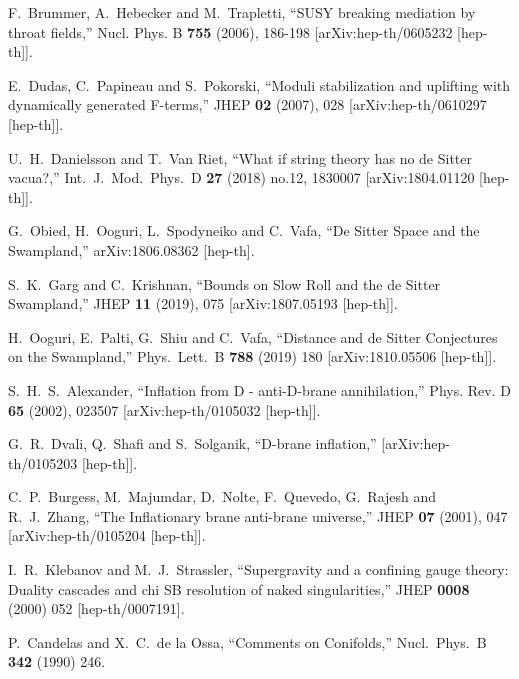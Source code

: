 \documentclass[12pt]{article}
\numberwithin{equation}{section}
\begin{document}
\begin{thebibliography}{999}
F.~Brummer, A.~Hebecker and M.~Trapletti,
``SUSY breaking mediation by throat fields,''
Nucl. Phys. B \textbf{755} (2006), 186-198
[arXiv:hep-th/0605232 [hep-th]].

E.~Dudas, C.~Papineau and S.~Pokorski,
``Moduli stabilization and uplifting with dynamically generated F-terms,''
JHEP \textbf{02} (2007), 028
[arXiv:hep-th/0610297 [hep-th]].

  U.~H.~Danielsson and T.~Van Riet,
  ``What if string theory has no de Sitter vacua?,''
  Int.\ J.\ Mod.\ Phys.\ D {\bf 27} (2018) no.12,  1830007
  [arXiv:1804.01120 [hep-th]].

  G.~Obied, H.~Ooguri, L.~Spodyneiko and C.~Vafa,
  ``De Sitter Space and the Swampland,''
  arXiv:1806.08362 [hep-th].

S.~K.~Garg and C.~Krishnan,
``Bounds on Slow Roll and the de Sitter Swampland,''
JHEP \textbf{11} (2019), 075
[arXiv:1807.05193 [hep-th]].

  H.~Ooguri, E.~Palti, G.~Shiu and C.~Vafa,
  ``Distance and de Sitter Conjectures on the Swampland,''
  Phys.\ Lett.\ B {\bf 788} (2019) 180
  [arXiv:1810.05506 [hep-th]].

S.~H.~S.~Alexander,
``Inflation from D - anti-D-brane annihilation,''
Phys. Rev. D \textbf{65} (2002), 023507
[arXiv:hep-th/0105032 [hep-th]].

G.~R.~Dvali, Q.~Shafi and S.~Solganik,
``D-brane inflation,''
[arXiv:hep-th/0105203 [hep-th]].

C.~P.~Burgess, M.~Majumdar, D.~Nolte, F.~Quevedo, G.~Rajesh and R.~J.~Zhang,
``The Inflationary brane anti-brane universe,''
JHEP \textbf{07} (2001), 047
[arXiv:hep-th/0105204 [hep-th]].

  I.~R.~Klebanov and M.~J.~Strassler,
  ``Supergravity and a confining gauge theory: Duality cascades and chi 
  SB resolution of naked singularities,''
  JHEP {\bf 0008} (2000) 052
  [hep-th/0007191].

  P.~Candelas and X.~C.~de la Ossa,
  ``Comments on Conifolds,''
  Nucl.\ Phys.\ B {\bf 342} (1990) 246.


\end{thebibliography}
\end{document}
